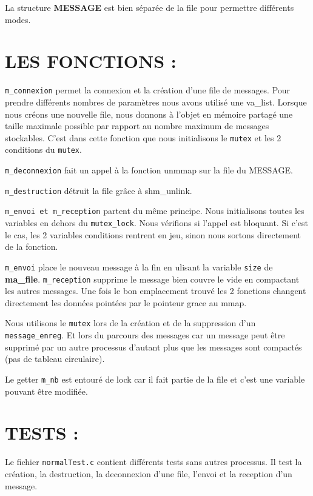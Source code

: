 \documentclass{article}
\begin{document}
La structure {\bf MESSAGE} est bien séparée de la file pour permettre
différents modes.


\section{LES FONCTIONS :}

{\tt m\_connexion} permet la connexion et la création d'une file de messages.
Pour prendre différents nombres de paramètres nous avons utilisé une va\_list.
Lorsque nous créons une nouvelle file, nous donnons à l'objet en mémoire partagé
une taille maximale possible par rapport au nombre maximum de messages stockables.
C'est dans cette fonction que nous initialisons le {\tt mutex} et les 2 conditions du {\tt mutex}.


{\tt m\_deconnexion} fait un appel à la fonction unmmap sur la file du MESSAGE.


{\tt m\_destruction} détruit la file grâce à shm\_unlink.


{\tt m\_envoi et m\_reception} partent du même principe.
Nous initialisons toutes les variables en dehors du {\tt mutex\_lock}.
Nous vérifions si l'appel est bloquant. Si c'est le cas, les 2 variables
conditions rentrent en jeu, sinon nous sortons directement de la fonction.


{\tt m\_envoi} place le nouveau message à la fin en ulisant la variable {\tt size} de {\bf ma\_file}.
{\tt m\_reception} supprime le message bien couvre le vide en compactant les autres messages.
Une fois le bon emplacement trouvé les 2 fonctions changent directement les données
pointées par le pointeur grace au mmap.

Nous utilisons le {\tt mutex} lors de la création et de la suppression d'un {\tt message\_enreg}.
Et lors du parcours des messages car un message peut être
supprimé par un autre processus d'autant plus que les messages sont compactés
(pas de tableau circulaire).

Le getter {\tt m\_nb} est entouré de lock car il fait partie de la file et c'est une variable
pouvant être modifiée.

\section{TESTS : }

Le fichier {\tt normalTest.c} contient différents tests sans autres processus.
Il test la création, la destruction, la deconnexion d'une file, l'envoi et
la reception d'un message.
\end{document}
